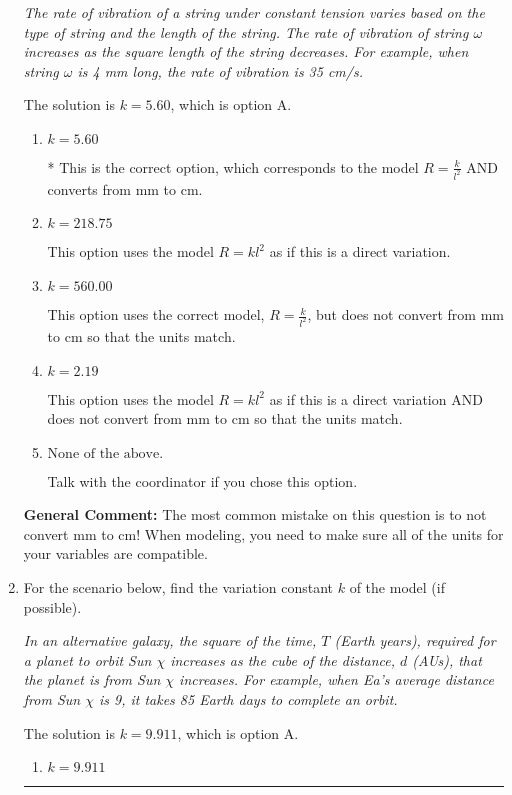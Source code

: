 \documentclass{extbook}[14pt]
\newcommand{\litem}[1]{\item #1

\rule{\textwidth}{0.4pt}}
\begin{document}
\begin{enumerate}
{\begin{center}
    \textit{ The rate of vibration of a string under constant tension varies based on the type of string and the length of the string. The rate of vibration of string $\omega$ increases as the square length of the string decreases. For example, when string $\omega$ is 4 mm long, the rate of vibration is 35 cm/s. }
\end{center}
The solution is \( k = 5.60 \), which is option A.\begin{enumerate}[label=\Alph*.]
\item \( k = 5.60 \)

* This is the correct option, which corresponds to the model $R = \frac{k}{l^{2}}$ AND converts from mm to cm.
\item \( k = 218.75 \)

This option uses the model $R = kl^{2}$ as if this is a direct variation.
\item \( k = 560.00 \)

This option uses the correct model, $R = \frac{k}{l^{2}}$, but does not convert from mm to cm so that the units match.
\item \( k = 2.19 \)

This option uses the model $R = kl^{2}$ as if this is a direct variation AND does not convert from mm to cm so that the units match.
\item \( \text{None of the above.} \)

Talk with the coordinator if you chose this option.
\end{enumerate}

\textbf{General Comment:} The most common mistake on this question is to not convert mm to cm! When modeling, you need to make sure all of the units for your variables are compatible.
}
\litem{
For the scenario below, find the variation constant $k$ of the model (if possible).

\begin{center}
    \textit{ In an alternative galaxy, the square of the time, $T$ (Earth years), required for a planet to orbit Sun $\chi$ increases as the cube of the distance, $d$ (AUs), that the planet is from Sun $\chi$ increases. For example, when Ea's average distance from Sun $\chi$ is 9, it takes 85 Earth days to complete an orbit. }
\end{center}
The solution is \( k = 9.911 \), which is option A.\begin{enumerate}[label=\Alph*.]
\item \( k = 9.911 \)


\end{enumerate}}
\end{enumerate}
\end{document}
